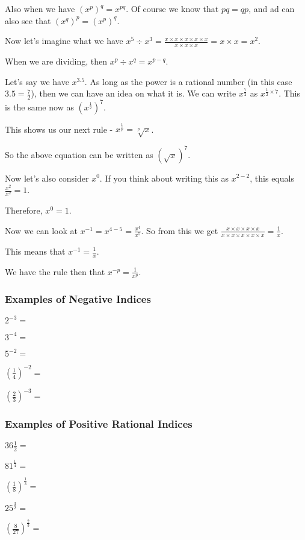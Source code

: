 \documentclass[../maths.tex]{subfiles}
\begin{document}
Also when we have $(x^p)^q = x^{pq}$. Of course we know that $pq = qp$, and ad can also see that $(x^q)^p = (x^p)^q$.

Now let's imagine what we have $x^5 \div x^3 = \frac{x \times x\times x\times x\times x}{x\times x\times x} = x\times x = x^2$.

When we are dividing, then $x^p \div x^q = x^{p-q}$.

Let's say we have $x^{3.5}$. As long as the power is a rational number (in this case $3.5=\frac{7}{2}$), then we can have an idea on what it is. We can write $x^{\frac{7}{2}}$ as $x^{\frac{1}{2}\times 7}$.
This is the same now as $(x^{\frac{1}{2}})^7$.

This shows us our next rule - $x^{\frac{1}{p}} = \sqrt[p]{x}$.

So the above equation can be written as $(\sqrt{x})^7$.

Now let's also consider $x^0$. If you think about writing this as $x^{2-2}$, this equals $\frac{x^2}{x^2} = 1$.

Therefore, $x^0=1$.

Now we can look at $x^{-1} = x^{4-5} = \frac{x^4}{x^5}$. So from this we get $\frac{x\times x\times x\times x}{x\times x\times x\times x\times x} = \frac{1}{x}$.

This means that $x^{-1} = \frac{1}{x}$.

We have the rule then that $x^{-p} = \frac{1}{x^p}$.

\subsubsection*{Examples of Negative Indices}
\ex $2^{-3} = $

\ex $3^{-4} = $

\ex $5^{-2} = $

\ex $\left(\frac{1}{4}\right)^{-2} = $

\ex $\left(\frac{2}{3}\right)^{-3} = $

\subsubsection*{Examples of Positive Rational Indices}

\ex $36{\frac{1}{2}} = $

\ex $81^{\frac{1}{4}} = $

\ex $\left(\frac{1}{8}\right)^{\frac{1}{3}} = $

\ex $25^{\frac{3}{2}} = $

\ex $\left(\frac{8}{27}\right)^{\frac{2}{3}} = $
\end{document}
